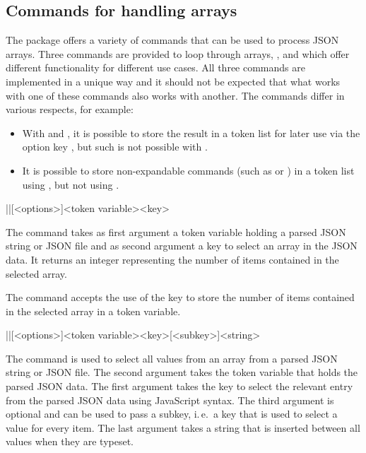 \documentclass[a4paper]{article}
\begin{document}
{{\subsection{Commands for handling arrays}

The package offers a variety of commands that can be used to process JSON arrays. Three commands are provided to loop through arrays, \macro{\JSONParseArrayUse}, \macro{\JSONParseArrayMapFunction} and \macro{\JSONParseArrayMapInline} which offer different functionality for different use cases. All three commands are implemented in a unique way and it should not be expected that what works with one of these commands also works with another. The commands differ in various respects, for example:

\begin{itemize}
  \item With \macro{\JSONParseArrayUse} and \macro{\JSONParseArrayMapInline}, it is possible to store the result in a token list for later use via the option key , but such is not possible with \macro{\JSONParseArrayMapFunction}.
  \item It is possible to store non-expandable commands (such as \macro{\emph} or \macro{\textbf}) in a token list using \macro{\JSONParseArrayUse}, but not using \macro{\JSONParseArrayMapInline}.
\end{itemize}

\begin{macrodef}
|\JSONParseArrayCount|[<options>]{<token variable>}{<key>}
\end{macrodef}
The command \macro{\JSONParseArrayCount} takes as first argument a token variable holding a parsed JSON string or JSON file and as second argument a key to select an array in the JSON data. It returns an integer representing the number of items contained in the selected array.

The command \macro{\JSONParseArrayCount} accepts the use of the key  to store the number of items contained in the selected array in a token variable.

\begin{macrodef}
|\JSONParseArrayUse|[<options>]{<token variable>}{<key>}[<subkey>]{<string>}
\end{macrodef}
The command \macro{\JSONParseArrayUse} is used to select all values from an array from a parsed JSON string or JSON file. The second argument takes the token variable that holds the parsed JSON data. The first argument takes the key to select the relevant entry from the parsed JSON data using JavaScript syntax. The third argument is optional and can be used to pass a subkey, i.\,e.\ a key that is used to select a value for every item. The last argument takes a string that is inserted between all values when they are typeset.

}}
\end{document}
